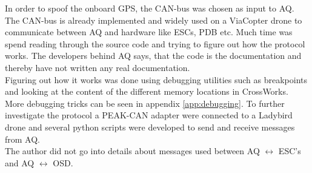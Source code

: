In order to spoof the onboard GPS, the CAN-bus was chosen as input to AQ. 
The CAN-bus is already implemented and widely used on a ViaCopter drone to communicate between AQ and hardware like ESCs, PDB etc. Much time was spend reading through the source code and trying to figure out how the protocol works.
The developers behind AQ says, that the code is the documentation and thereby have not written any real documentation. \\
Figuring out how it works was done using debugging utilities such as breakpoints and looking at the content of the different memory locations in CrossWorks.\\
More debugging tricks can be seen in appendix \ref{app:debugging}. 
To further investigate the protocol a PEAK-CAN adapter were connected to a Ladybird drone and several python scripts were developed to send and receive messages from AQ. \\
The author did not go into details about messages used between AQ $\leftrightarrow$ ESC's and AQ $\leftrightarrow$ OSD.\\


